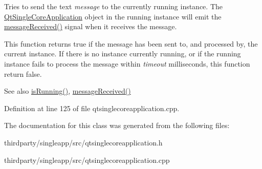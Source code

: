 Tries to send the text {\itshape message} to the currently running instance. The \hyperlink{class_qt_single_core_application}{Qt\+Single\+Core\+Application} object in the running instance will emit the \hyperlink{class_qt_single_core_application_a1af66a1770ff5eec8006a26a2ce42ca1}{message\+Received()} signal when it receives the message.

This function returns true if the message has been sent to, and processed by, the current instance. If there is no instance currently running, or if the running instance fails to process the message within {\itshape timeout} milliseconds, this function return false.

\begin{DoxySeeAlso}{See also}
\hyperlink{class_qt_single_core_application_a419bfb7b02f0459f4d207d448bc6c876}{is\+Running()}, \hyperlink{class_qt_single_core_application_a1af66a1770ff5eec8006a26a2ce42ca1}{message\+Received()} 
\end{DoxySeeAlso}


Definition at line 125 of file qtsinglecoreapplication.\+cpp.



The documentation for this class was generated from the following files\+:\begin{DoxyCompactItemize}
\item 
thirdparty/singleapp/src/qtsinglecoreapplication.\+h\item 
thirdparty/singleapp/src/qtsinglecoreapplication.\+cpp\end{DoxyCompactItemize}
